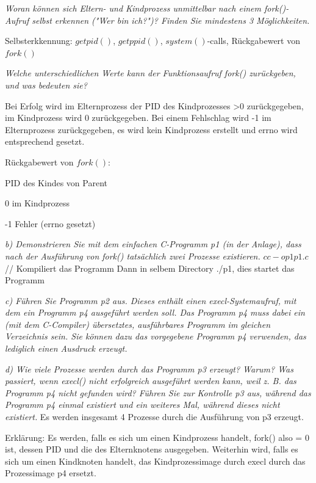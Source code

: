 \documentclass[a4paper]{article}
\begin{document}
\textit{Woran können sich Eltern- und Kindprozess unmittelbar nach einem fork()-Aufruf selbst erkennen ("Wer bin ich?")? Finden Sie mindestens 3 Möglichkeiten. }

Selbsterkkennung: $getpid()$, $getppid()$, $system()$-calls, Rückgabewert von $fork()$

\textit{Welche unterschiedlichen Werte kann der Funktionsaufruf fork() zurückgeben, und was bedeuten sie?}
\vspace{10mm}

Bei Erfolg wird im Elternprozess der PID des Kindprozesses >0 zurückgegeben, im Kindprozess wird 0 zurückgegeben. Bei einem Fehlschlag wird -1 im Elternprozess zurückgegeben, es wird kein Kindprozess erstellt und errno wird entsprechend gesetzt.

Rückgabewert von $fork()$:
\begin{itemize*}
    \item PID des Kindes von Parent
    \item 0 im Kindprozess
    \item -1 Fehler (errno gesetzt)
\end{itemize*}

\textit{b) Demonstrieren Sie mit dem einfachen C-Programm p1 (in der Anlage), dass nach der Ausführung von fork() tatsächlich zwei Prozesse existieren.}
\vspace{10mm}
$cc -o p1 p1.c$ // Kompiliert das Programm
Dann in selbem Directory ./p1, dies startet das Programm


\textit{c) Führen Sie Programm p2 aus. Dieses enthält einen execl-Systemaufruf, mit dem ein Programm p4 ausgeführt werden soll. Das Programm p4 muss dabei ein (mit dem C-Compiler) übersetztes, ausführbares Programm im gleichen Verzeichnis sein. Sie können dazu das vorgegebene Programm p4 verwenden, das lediglich einen Ausdruck erzeugt.}
\vspace{10mm}


\textit{d) Wie viele Prozesse werden durch das Programm p3 erzeugt? Warum? Was passiert, wenn execl() nicht erfolgreich ausgeführt werden kann, weil z. B. das Programm p4 nicht gefunden wird? Führen Sie zur Kontrolle p3 aus, während das Programm p4 einmal existiert und ein weiteres Mal, während dieses nicht existiert.}
\vspace{10mm}
Es werden insgesamt 4 Prozesse durch die Ausführung von p3 erzeugt.

Erklärung:
Es werden, falls es sich um einen Kindprozess handelt, fork() also = 0 ist, dessen PID und die des Elternknotens ausgegeben.
Weiterhin wird, falls es sich um einen Kindknoten handelt, das Kindprozessimage durch execl durch das Prozessimage p4 ersetzt.
\end{document}
